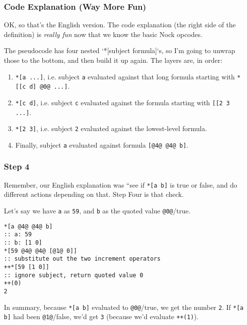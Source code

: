 \documentclass[twoside]{article}
\begin{document}
\subsubsection{Code Explanation (Way More Fun)}

OK, so that's the English version. The code explanation (the right side of the definition) is \emph{really fun} now that we know the basic Nock opcodes.

The pseudocode has four nested `*[subject formula]`s, so I'm going to unwrap those to the bottom, and then build it up again. The layers are, in order:

\begin{enumerate}
  \item  \lstinline[style=inlinecode]{*[a ...]}, i.e. subject \lstinline[style=inlinecode]{a} evaluated against that long formula starting with \lstinline[style=inlinecode]{*[[c d] @0@ ...]}.
  \item  \lstinline[style=inlinecode]{*[c d]}, i.e. subject \lstinline[style=inlinecode]{c} evaluated against the formula starting with \lstinline[style=inlinecode]{[[2 3 ...]}.
  \item  \lstinline[style=inlinecode]{*[2 3]}, i.e. subject \lstinline[style=inlinecode]{2} evaluated against the lowest-level formula.
  \item  Finally, subject \lstinline[style=inlinecode]{a} evaluated against formula \lstinline[style=inlinecode]{[@4@ @4@ b]}.
\end{enumerate}

\subsubsection{Step 4}

Remember, our English explanation was ``see if \lstinline[style=inlinecode]{*[a b]} is true or false, and do different actions depending on that. Step Four is that check.

Let's say we have \lstinline[style=inlinecode]{a} as \lstinline[style=inlinecode]{59}, and \lstinline[style=inlinecode]{b} as the quoted value \lstinline[style=inlinecode]{@0@}/true.

\begin{lstlisting}[style=listingblock]
*[a @4@ @4@ b]
:: a: 59
:: b: [1 0]
*[59 @4@ @4@ [@1@ 0]]
:: substitute out the two increment operators
++*[59 [1 0]]
:: ignore subject, return quoted value 0
++(0)
2
\end{lstlisting}

In summary, because \lstinline[style=inlinecode]{*[a b]} evaluated to \lstinline[style=inlinecode]{@0@}/true, we get the number \lstinline[style=inlinecode]{2}. If \lstinline[style=inlinecode]{*[a b]} had been \lstinline[style=inlinecode]{@1@}/false, we'd get \lstinline[style=inlinecode]{3} (because we'd evaluate \lstinline[style=inlinecode]{++(1)}).
\end{document}
